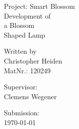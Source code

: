 \documentclass[doc.tex]{subfiles}
\begin{document}
    \begin{titlepage}
        \noindent
        Project: Smart Blossom
        \vspace{2em}
        \\
        {\fontsize{40}{50}\selectfont
        Development of \\[0.5em]
        a Blossom \\[0.5em]
        Shaped Lamp \\[0.5em]
        }
        \vspace*{\fill}
        \small 

        \hspace*{\fill} Written by \\
        \hspace*{\fill} Christopher Heiden \\
        \hspace*{\fill} MatNr.: 120249 \\
        \vspace{2em}

        \hspace*{\fill} Supervisor:  \\
        \hspace*{\fill} Clemens Wegener \\
        \vspace{2em}

        \hspace*{\fill} Submission: \\
        \hspace*{\fill} \bkdate\today 
    \end{titlepage}
    \newpage

    \tableofcontents
    \newpage
\end{document}
